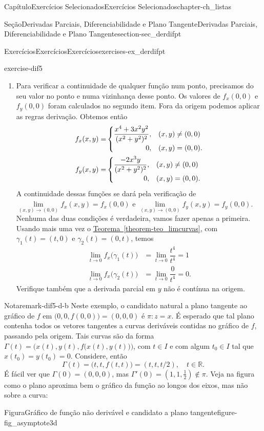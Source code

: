 \documentclass[oneside,10pt,]{book}
\newcommand{\xreffont}{\relax}
\numberwithin{equation}{section}
\newcommand{\R}{\mathbb R}
\begin{document}
\begin{chapterptx}{Capítulo}{Exercícios Selecionados}{}{Exercícios Selecionados}{}{}{chapter-ch_listas}
\begin{sectionptx}{Seção}{Derivadas Parciais, Diferenciabilidade e Plano Tangente}{}{Derivadas Parciais, Diferenciabilidade e Plano Tangente}{}{}{section-sec_derdifpt}
\begin{exercises-subsection-numberless}{Exercícios}{Exercícios}{}{Exercícios}{}{}{exercises-ex_derdifpt}
\begin{divisionexercise}{5}{}{}{exercise-dif5}
\begin{enumerate}[label=\alph*]
\item{}Para verificar a continuidade de qualquer função num ponto, precisamos do seu valor no ponto e numa vizinhança desse ponto. Os valores de \(f_x(0,0)\) e \(f_y(0,0)\) foram calculados no segundo item. Fora da origem podemos aplicar as regras derivação. Obtemos então%
\begin{align*}
f_x(x,y)=&\begin{cases}
\dfrac{x^4+3x^2y^2}{(x^2+y^2)^2},& (x,y)\neq (0,0)\\
\hfill 0,& (x,y)=(0,0).
\end{cases}\\
f_y(x,y)=&\begin{cases}
\dfrac{-2x^3y}{(x^2+y^2)^2},& (x,y)\neq (0,0)\\
\hfill 0,& (x,y)=(0,0).
\end{cases}
\end{align*}
A continuidade dessas funções se dará pela verificação de \(\lim\limits_{(x,y)\to (0,0)} f_x(x,y)=f_x(0,0)\) e \(\lim\limits_{(x,y)\to (0,0)}
f_y(x,y)=f_y(0,0)\). Nenhuma das duas condições é verdadeira, vamos fazer apenas a primeira. Usando mais uma vez o \hyperref[theorem-teo_limcurvas]{Teorema~{\xreffont\ref{theorem-teo_limcurvas}}}, com \(\gamma_1(t)=(t,0)\) e \(\gamma_2(t)=(0,t)\), temos%
\begin{align*}
\lim\limits_{t\to 0} f_x\big(\gamma_1(t)\big)
&=\lim\limits_{t\to 0}\dfrac{t^4}{t^4}=1\\
\lim\limits_{t\to 0} f_x\big(\gamma_2(t)\big)
&=\lim\limits_{t\to 0}\dfrac{0}{t^4}=0.
\end{align*}
Verifique também que a derivada parcial em \(y\) não é contínua na origem.%
\end{enumerate}
%
\begin{remark}{Nota}{}{remark-dif5-d-b}%
Neste exemplo, o candidato natural a plano tangente ao gráfico de \(f\) em \(\big(0,0,f(0,0)\big)=(0,0,0)\) é \(\pi\colon z=x\). É esperado que tal plano contenha todos os vetores tangentes a curvas deriváveis contidas no gráfico de \(f\), passando pela origem. Tais curvas são da forma \(\Gamma(t)=\Big(x(t),y(t),f\big(x(t),y(t)\big)\Big)\), com \(t\in I\) e com algum \(t_0\in I\) tal que \(x(t_0)=y(t_0)=0\). Considere, então%
\begin{equation*}
\Gamma(t)=\big(t,t,f(t,t)\big)=(t,t,t/2),\quad t\in\R.
\end{equation*}
É fácil ver que \(\Gamma(0)=(0,0,0)\), mas \(\Gamma'(0)=(1,1,\frac{1}{2})\not\in\pi\). Veja na figura como o plano aproxima bem o gráfico da função ao longos dos eixos, mas não sobre a curva: \begin{figureptx}{Figura}{Gráfico de função não derivável e candidato a plano tangente}{figure-fig_asymptote3d}{}%

\end{figureptx}
\end{remark}
\end{divisionexercise}
\end{exercises-subsection-numberless}
\end{sectionptx}
\end{chapterptx}
\end{document}
